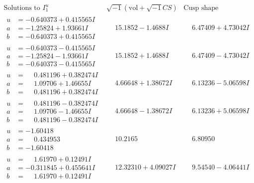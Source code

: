 \documentclass[1p]{elsarticle_modified}
\theoremstyle{definition}
\newcommand{\I}{\sqrt{-1}}
\begin{document}
$$\begin{array}{c|c|c}  
\text{Solutions to }I^u_{1}& \I (\text{vol} + \sqrt{-1}CS) & \text{Cusp shape}\\
 \hline 
\begin{aligned}
u &= -0.640373 + 0.415565 I \\
a &= -1.25824 + 1.93661 I \\
b &= -0.640373 + 0.415565 I\end{aligned}
 & \phantom{-}15.1852 - 1.4688 I & \phantom{-}6.47409 + 4.73042 I \\ \hline\begin{aligned}
u &= -0.640373 - 0.415565 I \\
a &= -1.25824 - 1.93661 I \\
b &= -0.640373 - 0.415565 I\end{aligned}
 & \phantom{-}15.1852 + 1.4688 I & \phantom{-}6.47409 - 4.73042 I \\ \hline\begin{aligned}
u &= \phantom{-}0.481196 + 0.382474 I \\
a &= \phantom{-}1.09706 + 1.46655 I \\
b &= \phantom{-}0.481196 + 0.382474 I\end{aligned}
 & \phantom{-}4.66648 + 1.38672 I & \phantom{-}6.13236 - 5.06598 I \\ \hline\begin{aligned}
u &= \phantom{-}0.481196 - 0.382474 I \\
a &= \phantom{-}1.09706 - 1.46655 I \\
b &= \phantom{-}0.481196 - 0.382474 I\end{aligned}
 & \phantom{-}4.66648 - 1.38672 I & \phantom{-}6.13236 + 5.06598 I \\ \hline\begin{aligned}
u &= -1.60418\phantom{ +0.000000I} \\
a &= \phantom{-}0.434953\phantom{ +0.000000I} \\
b &= -1.60418\phantom{ +0.000000I}\end{aligned}
 & \phantom{-}10.2165\phantom{ +0.000000I} & \phantom{-}6.80950\phantom{ +0.000000I} \\ \hline\begin{aligned}
u &= \phantom{-}1.61970 + 0.12491 I \\
a &= -0.311845 + 0.455641 I \\
b &= \phantom{-}1.61970 + 0.12491 I\end{aligned}
 & \phantom{-}12.32310 + 4.09027 I & \phantom{-}9.54540 - 4.06441 I \\ \hline\begin{aligned}

\end{aligned}
\end{array}$$
\end{document}
